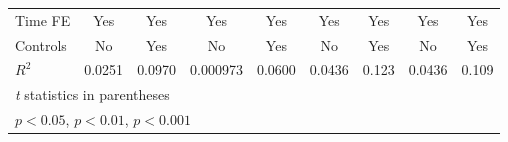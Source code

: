 {\begin{tabular}{l*{8}{c}}
Time FE         &      Yes         &      Yes         &      Yes         &      Yes         &      Yes         &      Yes         &      Yes         &      Yes         \\
Controls        &       No         &      Yes         &       No         &      Yes         &       No         &      Yes         &       No         &      Yes         \\
$ R^2 $         &   0.0251         &   0.0970         & 0.000973         &   0.0600         &   0.0436         &    0.123         &   0.0436         &    0.109         \\
\hline\hline
\multicolumn{9}{l}{\footnotesize \textit{t} statistics in parentheses}\\
\multicolumn{9}{l}{\footnotesize \sym{*} \(p<0.05\), \sym{**} \(p<0.01\), \sym{***} \(p<0.001\)}\\
\end{tabular}
}
